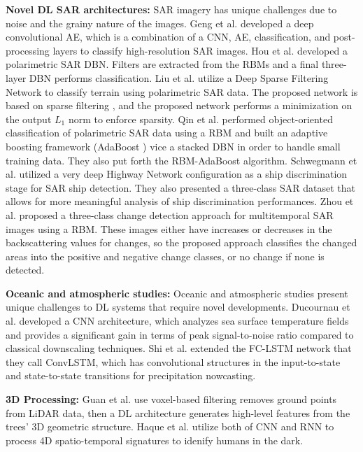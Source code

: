 \documentclass[12pt]{spieman}
\begin{document}
\begin{spacing}{1}
\textbf{Novel DL SAR architectures:} SAR imagery has unique challenges due to noise and the grainy nature of the images. Geng et al. \cite{Geng2015SAR} developed a deep convolutional AE, which is a combination of a CNN, AE, classification, and post-processing layers to classify high-resolution SAR images. Hou et al. \cite{Hou2015Polarimetric} developed a polarimetric SAR DBN. Filters are extracted from the RBMs and a final three-layer DBN performs classification. Liu et al. \cite{Liu2016Terrain} utilize a Deep Sparse Filtering Network to classify terrain using polarimetric SAR data. The proposed network is based on sparse filtering \cite{ngiam2011sparse} , and the proposed network performs a minimization on the output $L_{1}$ norm to enforce sparsity. Qin et al. \cite{qin2017object} performed object-oriented classification of polarimetric SAR data using a RBM and built an adaptive boosting framework (AdaBoost \cite{freund1995desicion} ) vice a stacked DBN in order to handle small training data. They also put forth the RBM-AdaBoost algorithm. Schwegmann et al. \cite{schwegmann2016very} utilized a very deep Highway Network configuration as a ship discrimination stage for SAR ship detection. They also presented a three-class SAR dataset that allows for more meaningful analysis of ship discrimination performances. Zhou et al. \cite{zhao2015three} proposed a three-class change detection approach for multitemporal SAR images using a RBM. These images either have increases or decreases in the backscattering values for changes, so the proposed approach classifies the changed areas into the positive and negative change classes, or no change if none is detected.


\textbf{Oceanic and atmospheric studies:} Oceanic and atmospheric studies present unique challenges to DL systems that require novel developments. Ducournau et al. \cite{Ducournau2016Deep} developed a CNN architecture, which analyzes sea surface temperature fields and provides a significant gain in terms of peak signal-to-noise ratio compared to classical downscaling techniques. Shi et al. \cite{Shi2015Convolutional} extended the FC-LSTM network that they call ConvLSTM, which has convolutional structures in the input-to-state and state-to-state transitions for precipitation nowcasting.


\textbf{3D Processing:} Guan et al. \cite{Guan2015Deep} use voxel-based filtering removes ground points from LiDAR data, then a DL architecture generates high-level features from the trees’ 3D geometric structure. Haque et al. \cite{Haque2016} utilize both of CNN and RNN to process 4D spatio-temporal signatures to idenify humans in the dark.



\end{spacing}
\end{document}
